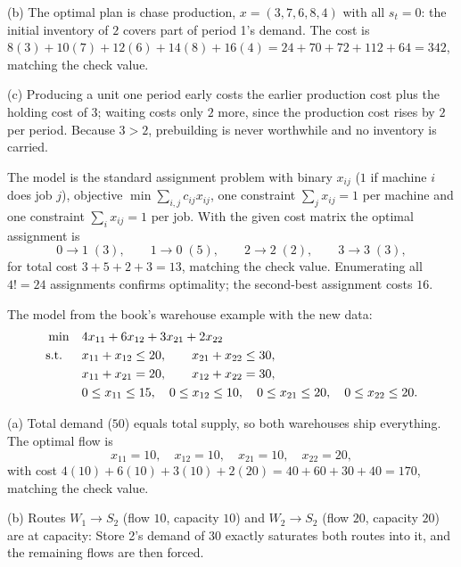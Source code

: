 (b) The optimal plan is chase production, $x = (3, 7, 6, 8, 4)$ with all $s_t = 0$: the initial inventory of $2$ covers part of period 1's demand. The cost is $8(3) + 10(7) + 12(6) + 14(8) + 16(4) = 24 + 70 + 72 + 112 + 64 = 342$, matching the check value.

(c) Producing a unit one period early costs the earlier production cost plus the holding cost of $3$; waiting costs only $2$ more, since the production cost rises by $2$ per period. Because $3 > 2$, prebuilding is never worthwhile and no inventory is carried.


The model is the standard assignment problem with binary $x_{ij}$ ($1$ if machine $i$ does job $j$), objective $\min \sum_{i,j} c_{ij} x_{ij}$, one constraint $\sum_j x_{ij} = 1$ per machine and one constraint $\sum_i x_{ij} = 1$ per job. With the given cost matrix the optimal assignment is
\[
0 \to 1 \;(3), \qquad 1 \to 0 \;(5), \qquad 2 \to 2 \;(2), \qquad 3 \to 3 \;(3),
\]
for total cost $3 + 5 + 2 + 3 = 13$, matching the check value. Enumerating all $4! = 24$ assignments confirms optimality; the second-best assignment costs $16$.


The model from the book's warehouse example with the new data:
\begin{align*}
\min \quad & 4x_{11} + 6x_{12} + 3x_{21} + 2x_{22}\\
\text{s.t.}\;\; \quad & x_{11} + x_{12} \leq 20, \qquad x_{21} + x_{22} \leq 30,\\
& x_{11} + x_{21} = 20, \qquad x_{12} + x_{22} = 30,\\
& 0 \leq x_{11} \leq 15, \quad 0 \leq x_{12} \leq 10, \quad 0 \leq x_{21} \leq 20, \quad 0 \leq x_{22} \leq 20.
\end{align*}

(a) Total demand ($50$) equals total supply, so both warehouses ship everything. The optimal flow is
\[
x_{11} = 10, \quad x_{12} = 10, \quad x_{21} = 10, \quad x_{22} = 20,
\]
with cost $4(10) + 6(10) + 3(10) + 2(20) = 40 + 60 + 30 + 40 = 170$, matching the check value.

(b) Routes $W_1 \to S_2$ (flow $10$, capacity $10$) and $W_2 \to S_2$ (flow $20$, capacity $20$) are at capacity: Store 2's demand of $30$ exactly saturates both routes into it, and the remaining flows are then forced.

